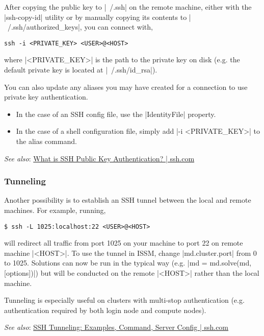 After copying the public key to \lstinlinebg|~/.ssh| on the remote machine, either with the \lstinlinebg|ssh-copy-id| utility or by manually copying its contents to \lstinlinebg|~/.ssh/authorized_keys|, you can connect with,
\begin{lstlisting}
ssh -i <PRIVATE_KEY> <USER>@<HOST>
\end{lstlisting}
where \lstinlinebg|<PRIVATE_KEY>| is the path to the private key on disk (e.g. the default private key is located at \lstinlinebg|~/.ssh/id_rsa|).

You can also update any aliases you may have created for a connection to use private key authentication.
\begin{itemize}
	\item In the case of an SSH config file, use the \lstinlinebg|IdentityFile| property.
	\item In the case of a shell configuration file, simply add \lstinlinebg|-i <PRIVATE_KEY>| to the alias command.
\end{itemize}

\emph{See also}: \href{https://www.ssh.com/academy/ssh/public-key-authentication}{What is SSH Public Key Authentication? | ssh.com}

\subsubsection{Tunneling}
Another possibility is to establish an SSH tunnel between the local and remote machines. For example, running,
\begin{lstlisting}
$ ssh -L 1025:localhost:22 <USER>@<HOST>
\end{lstlisting}
will redirect all traffic from port 1025 on your machine to port 22 on remote machine \lstinlinebg|<HOST>|. To use the tunnel in ISSM, change \lstinlinebg|md.cluster.port| from 0 to 1025. Solutions can now be run in the typical way (e.g. \lstinlinebg|md = md.solve(md, [options])|) but will be conducted on the remote \lstinlinebg|<HOST>| rather than the local machine.

Tunneling is especially useful on clusters with multi-stop authentication (e.g. authentication required by both login node and compute nodes).

\emph{See also}: \href{https://www.ssh.com/academy/ssh/tunneling-example}{SSH Tunneling: Examples, Command, Server Config | ssh.com}

\clearpage %
